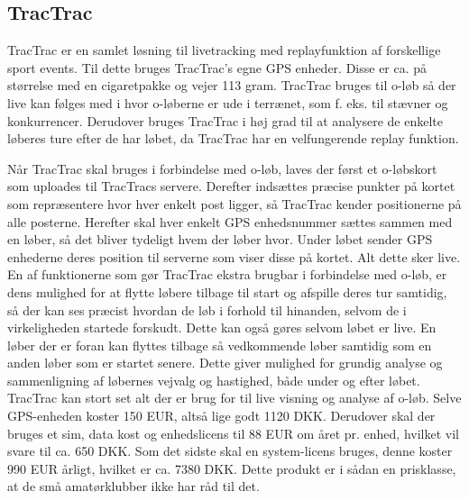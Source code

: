 \subsection{TracTrac}
TracTrac er en samlet løsning til livetracking med replayfunktion af forskellige sport events. Til dette bruges TracTrac's egne GPS enheder. Disse er ca. på størrelse med en cigaretpakke og vejer 113 gram.\newline
TracTrac bruges til o-løb så der live kan følges med i hvor o-løberne er ude i terrænet, som f. eks. til stævner og konkurrencer. Derudover bruges TracTrac i høj grad til at analysere de enkelte løberes ture efter de har løbet, da TracTrac har en velfungerende replay funktion. 

Når TracTrac skal bruges i forbindelse med o-løb, laves der først et o-løbskort som uploades til TracTracs servere. Derefter indsættes præcise punkter på kortet som repræsentere hvor hver enkelt post ligger, så TracTrac kender positionerne på alle posterne. Herefter skal hver enkelt GPS enhedsnummer sættes sammen med en løber, så det bliver tydeligt hvem der løber hvor. Under løbet sender GPS enhederne deres position til serverne som viser disse på kortet. Alt dette sker live. En af funktionerne som gør TracTrac ekstra brugbar i forbindelse med o-løb, er dens mulighed for at flytte løbere tilbage til start og afspille deres tur samtidig, så der kan ses præcist hvordan de løb i forhold til hinanden, selvom de i virkeligheden startede forskudt. Dette kan også gøres selvom løbet er live. En løber der er foran kan flyttes tilbage så vedkommende løber samtidig som en anden løber som er startet senere. Dette giver mulighed for grundig analyse og sammenligning af løbernes vejvalg og hastighed, både under og efter løbet.\newline
TracTrac kan stort set alt der er brug for til live visning og analyse af o-løb. Selve GPS-enheden koster 150 EUR, altså lige godt 1120 DKK. Derudover skal der bruges et sim, data kost og enhedslicens til 88 EUR om året pr. enhed, hvilket vil svare til ca. 650 DKK. Som det sidste skal en system-licens bruges, denne koster 990 EUR årligt, hvilket er ca. 7380 DKK. Dette produkt er i sådan en prisklasse, at de små amatørklubber ikke har råd til det. \citep{TTC}


